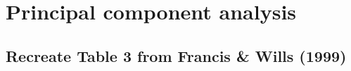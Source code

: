 \section{Principal component analysis}
\subsection{Recreate Table 3 from Francis \& Wills (1999)}


